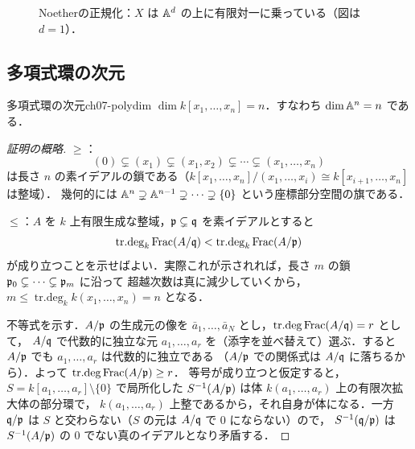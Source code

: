 \begin{figure}[H]
\centering
{}
\caption{Noetherの正規化：$X$ は $\mathbb{A}^d$ の上に有限対一に乗っている（図は $d=1$）．}
\end{figure}

\subsection{多項式環の次元}

\begin{mythm}{多項式環の次元}{ch07-polydim}
$\dim k[x_1,\dots,x_n]=n$．すなわち $\dim\mathbb{A}^n=n$ である．
\end{mythm}

\begin{proof}[証明の概略]
\textbf{$\ge$}：
\[
  (0)\subsetneq(x_1)\subsetneq(x_1,x_2)\subsetneq\cdots\subsetneq(x_1,\dots,x_n)
\]
は長さ $n$ の素イデアルの鎖である（$k[x_1,\dots,x_n]/(x_1,\dots,x_i)\cong k[x_{i+1},\dots,x_n]$ は整域）．
幾何的には $\mathbb{A}^n\supsetneq\mathbb{A}^{n-1}\supsetneq\cdots\supsetneq\{0\}$ という座標部分空間の旗である．

\textbf{$\le$}：$A$ を $k$ 上有限生成な整域，$\mathfrak{p}\subsetneq\mathfrak{q}$ を素イデアルとすると
\[
  \mathop{\mathrm{tr.deg}}\nolimits_k\operatorname{Frac}(A/\mathfrak{q})<\mathop{\mathrm{tr.deg}}\nolimits_k\operatorname{Frac}(A/\mathfrak{p})
\]
が成り立つことを示せばよい．実際これが示されれば，長さ $m$ の鎖 $\mathfrak{p}_0\subsetneq\cdots\subsetneq\mathfrak{p}_m$ に沿って
超越次数は真に減少していくから，$m\le\mathop{\mathrm{tr.deg}}\nolimits_k k(x_1,\dots,x_n)=n$ となる．

不等式を示す．$A/\mathfrak{p}$ の生成元の像を $\bar a_1,\dots,\bar a_N$ とし，$\mathop{\mathrm{tr.deg}}\nolimits\operatorname{Frac}(A/\mathfrak{q})=r$ として，
$A/\mathfrak{q}$ で代数的に独立な元 $a_1,\dots,a_r$ を（添字を並べ替えて）選ぶ．すると $A/\mathfrak{p}$ でも $a_1,\dots,a_r$ は代数的に独立である
（$A/\mathfrak{p}$ での関係式は $A/\mathfrak{q}$ に落ちるから）．よって $\mathop{\mathrm{tr.deg}}\nolimits\operatorname{Frac}(A/\mathfrak{p})\ge r$．
等号が成り立つと仮定すると，$S=k[a_1,\dots,a_r]\setminus\{0\}$ で局所化した $S^{-1}(A/\mathfrak{p})$ は体 $k(a_1,\dots,a_r)$ 上の有限次拡大体の部分環で，
$k(a_1,\dots,a_r)$ 上整であるから，それ自身が体になる．一方 $\mathfrak{q}/\mathfrak{p}$ は $S$ と交わらない（$S$ の元は $A/\mathfrak{q}$ で $0$ にならない）ので，
$S^{-1}(\mathfrak{q}/\mathfrak{p})$ は $S^{-1}(A/\mathfrak{p})$ の $0$ でない真のイデアルとなり矛盾する．
\end{proof}

